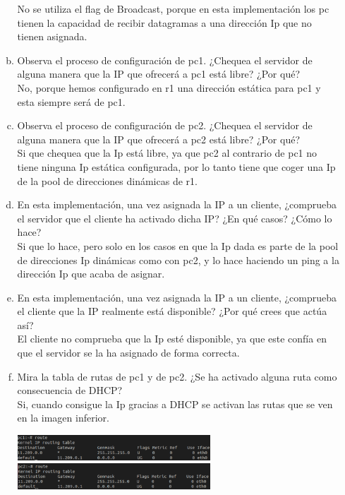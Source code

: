 \documentclass[12pt, a4paper]{report}
\begin{document}
\begin{enumerate}
\begin{enumerate}[a)]
		No se utiliza el flag de Broadcast, porque en esta implementación los pc tienen la capacidad de recibir datagramas a una dirección Ip que no tienen asignada.
		\item Observa el proceso de configuración de pc1. ¿Chequea el servidor de alguna manera que la IP que
		ofrecerá a pc1 está libre? ¿Por qué?\\
		
		No, porque hemos configurado en r1 una dirección estática para pc1 y esta siempre será de pc1.
		\item Observa el proceso de configuración de pc2. ¿Chequea el servidor de alguna manera que la IP que
		ofrecerá a pc2 está libre? ¿Por qué?\\
		
		Si que chequea que la Ip está libre, ya que pc2 al contrario de pc1 no tiene ninguna Ip estática configurada, por lo tanto tiene que coger una Ip de la pool de direcciones dinámicas de r1.
		\item En esta implementación, una vez asignada la IP a un cliente, ¿comprueba el servidor que el cliente
		ha activado dicha IP? ¿En qué casos? ¿Cómo lo hace?\\
		
		Si que lo hace, pero solo en los casos en que la Ip dada es parte de la pool de direcciones Ip dinámicas como con pc2, y lo hace haciendo un ping a la dirección Ip que acaba de asignar.
		\item En esta implementación, una vez asignada la IP a un cliente, ¿comprueba el cliente que la IP
		realmente está disponible? ¿Por qué crees que actúa así?\\
		
		El cliente no comprueba que la Ip esté disponible, ya que este confía en que el servidor se la ha asignado de forma correcta.
		\item Mira la tabla de rutas de pc1 y de pc2. ¿Se ha activado alguna ruta como consecuencia de DHCP?\\
		
		Si, cuando consigue la Ip gracias a DHCP se activan las rutas que se ven en la imagen inferior.
		\begin{center}
			\includegraphics[width=0.6\textwidth]{ej5_2_2}
			\includegraphics[width=0.6\textwidth]{ej5_3_2}
		\end{center}
	\end{enumerate}
\end{enumerate}
\end{document}
